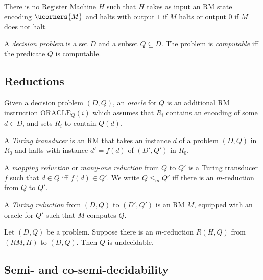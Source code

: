 \documentclass{article}
\begin{document}
\begin{theorem*}
	There is no Register Machine $H$ such that $H$ takes as input an RM state encoding
	$\ucorners{M}$ and halts with output $1$ if $M$ halts or output $0$ if $M$ does not halt.
\end{theorem*}


\begin{definition*}
	A \emph{decision problem} is a set $D$ and a subset $Q\subseteq D$.
	The problem is \emph{computable} iff the predicate $Q$ is computable.
\end{definition*}

\subsection{Reductions}

\begin{definition*}[Oracle]
	Given a decision problem $(D,Q)$, an \emph{oracle} for $Q$ is an additional
	RM instruction $\text{ORACLE}_Q(i)$ which assumes that $R_i$ contains an
	encoding of some $d\in D$, and sets $R_i$ to contain $Q(d)$.
\end{definition*}

\begin{definition*}
	A \emph{Turing transducer} is an RM that takes an instance $d$ of a problem $(D,Q)$
	in $R_0$ and halts with instance $d'=f(d)$ of $(D',Q')$ in $R_0$.
\end{definition*}

\begin{definition*}[m-reduction]
	A \emph{mapping reduction} or \emph{many-one reduction} from $Q$ to $Q'$ is a
	Turing transducer $f$ such that $d\in Q$ iff $f(d)\in Q'$. We write $Q\leq_m Q'$
	iff there is an $m$-reduction from $Q$ to $Q'$.
\end{definition*}

\begin{definition*}
	A \emph{Turing reduction} from $(D,Q)$ to $(D',Q')$ is an RM $M$, equipped with
	an oracle for $Q'$ such that $M$ computes $Q$.
\end{definition*}

\begin{theorem*}[Notes I.15]
	Let $(D,Q)$ be a problem. Suppose there is an $m$-reduction $R(H,Q)$ from
	$(RM, H)$ to $(D,Q)$. Then $Q$ is undecidable.
\end{theorem*}

\subsection{Semi- and co-semi-decidability}
\end{document}
